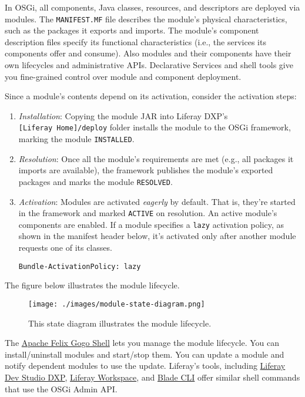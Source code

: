In OSGi, all components, Java classes, resources, and descriptors are
deployed via modules. The \texttt{MANIFEST.MF} file describes the
module's physical characteristics, such as the packages it exports and
imports. The module's component description files specify its functional
characteristics (i.e., the services its components offer and consume).
Also modules and their components have their own lifecycles and
administrative APIs. Declarative Services and shell tools give you
fine-grained control over module and component deployment.

Since a module's contents depend on its activation, consider the
activation steps:

\begin{enumerate}
\def\labelenumi{\arabic{enumi}.}
\item
  \emph{Installation}: Copying the module JAR into Liferay DXP's
  \texttt{{[}Liferay\ Home{]}/deploy} folder installs the module to the
  OSGi framework, marking the module \texttt{INSTALLED}.
\item
  \emph{Resolution}: Once all the module's requirements are met (e.g.,
  all packages it imports are available), the framework publishes the
  module's exported packages and marks the module \texttt{RESOLVED}.
\item
  \emph{Activation}: Modules are activated \emph{eagerly} by default.
  That is, they're started in the framework and marked \texttt{ACTIVE}
  on resolution. An active module's components are enabled. If a module
  specifies a \texttt{lazy} activation policy, as shown in the manifest
  header below, it's activated only after another module requests one of
  its classes.

\begin{verbatim}
Bundle-ActivationPolicy: lazy
\end{verbatim}
\end{enumerate}

The figure below illustrates the module lifecycle.

\begin{figure}
\centering
\texttt{[image: ./images/module-state-diagram.png]}
\caption{This state diagram illustrates the module lifecycle.}
\end{figure}

The
\href{/docs/7-2/customization/-/knowledge_base/c/using-the-felix-gogo-shell}{Apache
Felix Gogo Shell} lets you manage the module lifecycle. You can
install/uninstall modules and start/stop them. You can update a module
and notify dependent modules to use the update. Liferay's tools,
including
\href{/docs/7-2/reference/-/knowledge_base/r/liferay-dev-studio}{Liferay
Dev Studio DXP},
\href{/docs/7-2/reference/-/knowledge_base/r/liferay-workspace}{Liferay
Workspace}, and
\href{/docs/7-2/reference/-/knowledge_base/r/blade-cli}{Blade CLI} offer
similar shell commands that use the OSGi Admin API.

